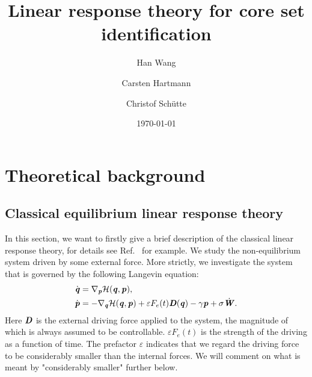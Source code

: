 \documentclass[aip,jcp,a4paper,reprint,onecolumn]{revtex4-1}
\newcommand{\vect}[1]{\textbf{\textit{#1}}}
\newcommand{\mh}{\mathcal H}
\newcommand{\eps}{\varepsilon}
\newcommand{\mo}{\mathcal O}
\begin{document}
\title{Linear response theory for core set identification}
\author{Han Wang}
\author{Carsten Hartmann}
\author{Christof Sch\"utte}

\date{\today}

\begin{abstract}
\end{abstract}

\maketitle

\section{Theoretical background}
\subsection{Classical equilibrium linear response theory}


In this section, we want to firstly give a brief description of the classical linear response
theory, for details see Ref.~\cite{tuckeman2010statistical} for
example.
We study the non-equilibrium system driven by some external force.
More strictly, we investigate the system that is governed by the
following Langevin equation:
\begin{align}\label{eqn:langevin-1}
  \dot{\vect q} & = \nabla_{\vect p}\mh(\vect q,\vect p), \\\label{eqn:langevin-2}
  \dot{\vect p} & =- \nabla_{\vect q}\mh(\vect q,\vect p)
  + \eps F_e(t) \vect D(\vect q) 
  - \gamma\vect p
  + \sigma\dot{\vect W}.
\end{align}
Here $\vect D$ is the external driving force applied to the system,
the magnitude of which is always assumed to be controllable.
$\eps F_e(t)$ is the strength of the driving as a function of time.
The prefactor $\eps$ indicates that we regard the driving force to be considerably smaller than the internal forces. We will comment on what is meant by "considerably smaller" further below.

\end{document}
